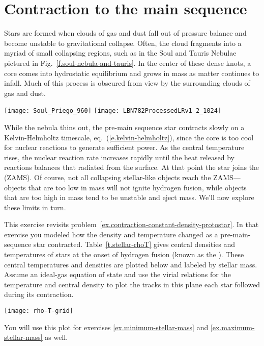 \section{Contraction to the main sequence}
\label{s.contraction-to-main-sequence}

Stars are formed when clouds of gas and dust fall out of pressure balance and become unstable to gravitational collapse. Often, the cloud fragments into a myriad of small collapsing regions, such as in the Soul and Tauris Nebulae pictured in Fig.~\ref{f.soul-nebula-and-tauris}. In the center of these dense knots, a core comes into hydrostatic equilibrium and grows in mass as matter continues to infall. Much of this process is obscured from view by the surrounding clouds of gas and dust.
\begin{marginfigure}
\texttt{[image: Soul\_Priego\_960]}
\texttt{[image: LBN782ProcessedLRv1-2\_1024]}
\caption[Pre-main sequence stars]{\label{f.soul-nebula-and-tauris} (Top) Image of the Soul Nebula (IC 1848) in the constellation Cassiopeia. \emph{Credit}: Jos\'e Jim\'enez Priego (Astromet). (Bottom) The Taurus molecular cloud. At right are million-year old pre-main sequence stars still embedded in dust clouds. \emph{Image Credit \& Copyright}: Lloyd L. Smith, Deep Sky West.}
\end{marginfigure}

While the nebula thins out, the pre-main sequence star contracts slowly on a Kelvin-Helmholtz timescale, eq.~(\ref{e.kelvin-helmholtz}), since the core is too cool for nuclear reactions to generate sufficient power. As the central temperature rises, the nuclear reaction rate increases rapidly until the heat released by reactions balances that radiated from the surface. At that point the star joins the  (ZAMS). Of course, not all collapsing stellar-like objects reach the ZAMS---objects that are too low in mass will not ignite hydrogen fusion, while objects that are too high in mass tend to be unstable and eject mass. We'll now explore these limits in turn.

\begin{exercisebox}
\label{ex.contraction-to-main-sequence}
This exercise revisits problem~\ref{ex.contraction-constant-density-protostar}. In that exercise you modeled how the density and temperature changed as a pre-main-sequence star contracted. Table~\ref{t.stellar-rhoT} gives central densities and temperatures of stars at the onset of hydrogen fusion (known as the ). These central temperatures and densities are plotted below and labeled by stellar mass. Assume an ideal-gas equation of state and use the virial relations for the temperature and central density to plot the tracks in this plane each star followed during its contraction.
\begin{center}
\texttt{[image: rho-T-grid]}
\end{center}
You will use this plot for exercises \ref{ex.minimum-stellar-mass} and \ref{ex.maximum-stellar-mass} as well.
\end{exercisebox}

